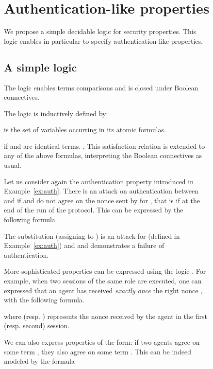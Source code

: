 \documentclass[acmtocl,acmnow]{acmtrans2m}
\begin{document}
\begin{figure}[t]
{{\section{Authentication-like properties}\label{sec:auth}
We propose a simple decidable logic for security properties. This
logic enables in particular to specify authentication-like properties.




\subsection{A simple logic}
The logic enables terms comparisons and is closed under Boolean connectives.



\begin{definition}
The logic  is inductively defined by:

 is the set of variables occurring in its atomic formulas.
\end{definition}

 if  and  are identical terms.
.
This satisfaction relation is extended to any of the above formulas, 
interpreting the Boolean connectives as usual.








\begin{example}
Let us consider again the authentication property introduced in
Example~\ref{ex:auth}. There is an attack on authentication between
 and   if  and  do not agree on the nonce  sent by
 for , that is if 
at the end of the run of the protocol.
This can be expressed by the following formula

The substitution  (assigning  to ) is an
attack for  (defined in Example~\ref{ex:auth}) and  and demonstrates
a failure of authentication.
\end{example}

More sophisticated properties can be expressed using the logic
. For example, when two sessions of the same role are executed, one can
expressed that an agent has received \emph{exactly once} the right
nonce , with the following formula.

where  (resp. ) represents the nonce received by the agent in the
first (resp. second) session.

We can also express properties of the form: if two agents agree on
some term , they also agree on some term . This can be indeed
modeled by the formula

}}
\end{figure}
\end{document}
